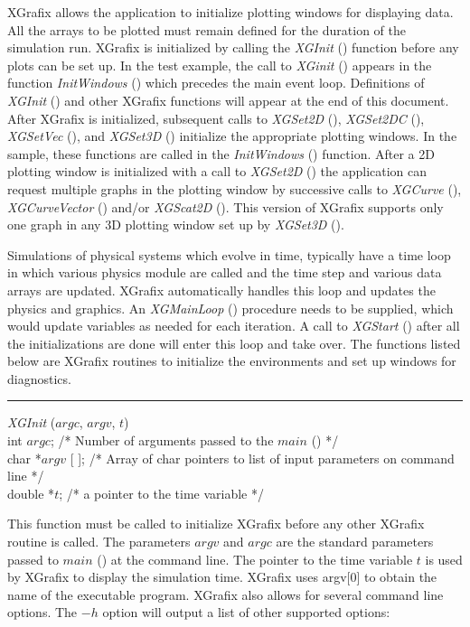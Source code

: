 XGrafix allows the application to initialize plotting windows for
displaying data.  All the arrays to be plotted must remain defined for
the duration of the simulation run.  XGrafix is initialized by calling
the {\em XGInit} () function before any plots can be set up.  In the
test example, the call to {\em XGinit} () appears in the function {\em
InitWindows} () which precedes the main event loop.  Definitions of
{\em XGInit} () and other XGrafix functions will appear at the end of
this document.  After XGrafix is initialized, subsequent calls to {\em
XGSet2D} (), {\em XGSet2DC} (), {\em XGSetVec} (), and {\em XGSet3D}
() initialize the appropriate plotting windows.  In the sample, these
functions are called in the {\em InitWindows} () function.  After a 2D
plotting window is initialized with a call to {\em XGSet2D} () the
application can request multiple graphs in the plotting window by
successive calls to {\em XGCurve} (), {\em XGCurveVector} () and/or {\em
XGScat2D} ().  This version of
XGrafix supports only one graph in any 3D plotting window set up by
{\em XGSet3D} ().

\newpage
Simulations of physical systems which evolve in time, typically have
a time loop in which various physics module are called and the
time step and various data arrays are updated.  XGrafix automatically handles
this loop and updates the physics and graphics.  An {\em XGMainLoop} () 
procedure needs to be supplied, which would update variables as needed for 
each iteration.  A call to {\em XGStart} () after all the initializations
are done will enter this loop and take over.
The functions listed below are XGrafix routines to
initialize the environments and set up windows for diagnostics.

\def\xlen{4in}
\begin{minipage}{\xlen}
\begin{flushright}
\rule{\xlen}{.5pt}
\end{flushright}
\end{minipage}

\begin{flushleft}
{\em XGInit} ($argc$, $argv$, $t$) \\
int $argc$; /* Number of arguments passed to the $main$ () */\\
char *$argv$ [ ]; /* Array of char pointers to list of input parameters on command line */ \\
double *$t$;  /* a pointer to the time variable */
\end{flushleft}
This function must be called to initialize XGrafix before any other XGrafix routine is
called.  The parameters $argv$ and $argc$ are the standard parameters passed to
$main$ () at the command line.  The pointer to the time variable $t$ is 
used by XGrafix to display the simulation time.  XGrafix uses argv[0] to 
obtain the name of the executable program.  XGrafix also allows for several command line options.  The $-h$ option will output a list of other supported options:

